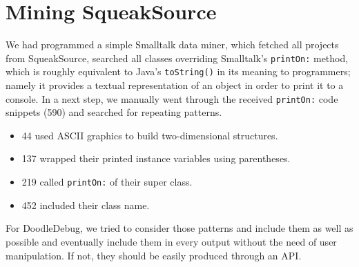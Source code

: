 \documentclass[a4paper,ngerman,english]{amsbook} %
\begin{document}
\section{Mining SqueakSource}
We had programmed a simple Smalltalk data miner, which fetched all projects from SqueakSource, searched all classes overriding Smalltalk's \verb.printOn:. method, which is roughly equivalent to Java's \verb.toString(). in its meaning to programmers; namely it provides a textual representation of an object in order to print it to a console. In a next step, we manually went through the received \verb.printOn:. code snippets (590) and searched for repeating patterns.
\begin{itemize}
	\item 44 used ASCII graphics to build two-dimensional structures.
	\item 137 wrapped their printed instance variables using parentheses.
	\item 219 called \verb.printOn:. of their super class.
	\item 452 included their class name.
\end{itemize}
For DoodleDebug, we tried to consider those patterns and include them as well as possible and eventually include them in every output without the need of user manipulation. If not, they should be easily produced through an API.
\end{document}
